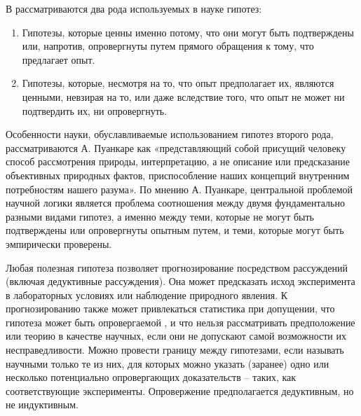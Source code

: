 В \cite{Poincare2015} рассматриваются два рода используемых в науке гипотез: 

\begin{enumerate}
    \item Гипотезы, которые ценны именно потому, что они могут быть подтверждены или, напротив, опровергнуты путем 
        прямого обращения к тому, что предлагает опыт.
    \item Гипотезы, которые, несмотря на то, что опыт предполагает их, являются ценными, невзирая на то, или даже 
        вследствие того, что опыт не может ни подтвердить их, ни опровергнуть.
\end{enumerate}

Особенности науки, обуславливаемые использованием гипотез второго рода, рассматриваются А. Пуанкаре как «представляющий 
собой присущий человеку способ рассмотрения природы, интерпретацию, а не описание или предсказание объективных 
природных фактов, приспособление наших концепций внутренним потребностям нашего разума». По мнению А. Пуанкаре, 
центральной проблемой научной логики является проблема соотношения между двумя фундаментально разными видами гипотез, 
а именно между теми, которые не могут быть подтверждены или опровергнуты опытным путем, и теми, которые могут 
быть эмпирически проверены.

Любая полезная гипотеза позволяет прогнозирование посредством рассуждений (включая дедуктивные рассуждения). 
Она может предсказать исход эксперимента в лабораторных условиях или наблюдение природного явления. К прогнозированию 
также может привлекаться статистика при допущении, что гипотеза может быть опровергаемой \cite{Popper2005}, и что 
нельзя рассматривать предположение или теорию в качестве научных, если они не допускают самой возможности их 
несправедливости. Можно провести границу между гипотезами, если называть научными только те из них, для которых 
можно указать (заранее) одно или несколько потенциально опровергающих доказательств – таких, как соответствующие 
эксперименты. Опровержение предполагается дедуктивным, но не индуктивным.

